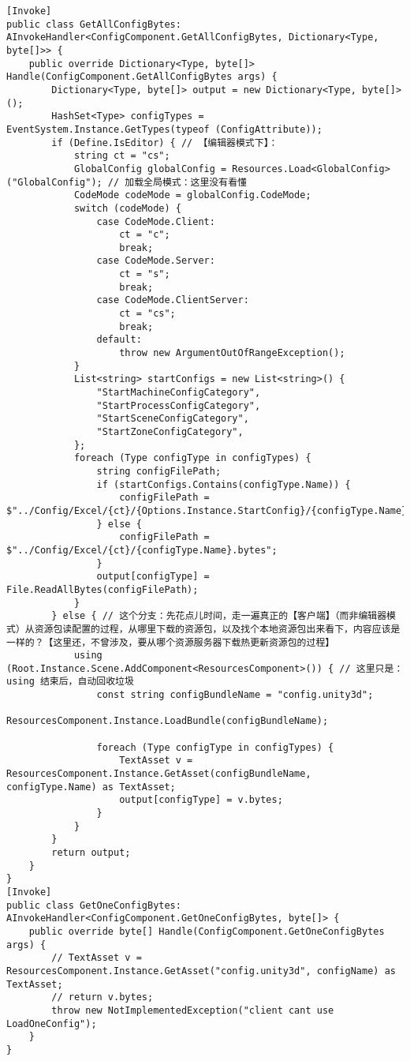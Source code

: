 \documentclass[9pt, b5paper]{article}
\begin{document}
\begin{verbatim}
[Invoke]
public class GetAllConfigBytes: AInvokeHandler<ConfigComponent.GetAllConfigBytes, Dictionary<Type, byte[]>> {
    public override Dictionary<Type, byte[]> Handle(ConfigComponent.GetAllConfigBytes args) {
        Dictionary<Type, byte[]> output = new Dictionary<Type, byte[]>();
        HashSet<Type> configTypes = EventSystem.Instance.GetTypes(typeof (ConfigAttribute));
        if (Define.IsEditor) { // 【编辑器模式下】：
            string ct = "cs";
            GlobalConfig globalConfig = Resources.Load<GlobalConfig>("GlobalConfig"); // 加载全局模式：这里没有看懂
            CodeMode codeMode = globalConfig.CodeMode;
            switch (codeMode) {
                case CodeMode.Client:
                    ct = "c";
                    break;
                case CodeMode.Server:
                    ct = "s";
                    break;
                case CodeMode.ClientServer:
                    ct = "cs";
                    break;
                default:
                    throw new ArgumentOutOfRangeException();
            }
            List<string> startConfigs = new List<string>() {
                "StartMachineConfigCategory", 
                "StartProcessConfigCategory", 
                "StartSceneConfigCategory", 
                "StartZoneConfigCategory",
            };
            foreach (Type configType in configTypes) {
                string configFilePath;
                if (startConfigs.Contains(configType.Name)) {
                    configFilePath = $"../Config/Excel/{ct}/{Options.Instance.StartConfig}/{configType.Name}.bytes";    
                } else {
                    configFilePath = $"../Config/Excel/{ct}/{configType.Name}.bytes";
                }
                output[configType] = File.ReadAllBytes(configFilePath);
            }
        } else { // 这个分支：先花点儿时间，走一遍真正的【客户端】（而非编辑器模式）从资源包读配置的过程，从哪里下载的资源包，以及找个本地资源包出来看下，内容应该是一样的？【这里还，不曾涉及，要从哪个资源服务器下载热更新资源包的过程】
            using (Root.Instance.Scene.AddComponent<ResourcesComponent>()) { // 这里只是： using 结束后，自动回收垃圾
                const string configBundleName = "config.unity3d";
                ResourcesComponent.Instance.LoadBundle(configBundleName);

                foreach (Type configType in configTypes) {
                    TextAsset v = ResourcesComponent.Instance.GetAsset(configBundleName, configType.Name) as TextAsset;
                    output[configType] = v.bytes;
                }
            }
        }
        return output;
    }
}
[Invoke]
public class GetOneConfigBytes: AInvokeHandler<ConfigComponent.GetOneConfigBytes, byte[]> {
    public override byte[] Handle(ConfigComponent.GetOneConfigBytes args) {
        // TextAsset v = ResourcesComponent.Instance.GetAsset("config.unity3d", configName) as TextAsset;
        // return v.bytes;
        throw new NotImplementedException("client cant use LoadOneConfig");
    }
}
\end{verbatim}
\end{document}
